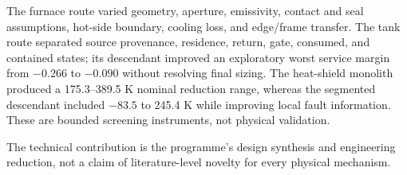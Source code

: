 The furnace route varied geometry, aperture, emissivity, contact and seal assumptions, hot-side boundary, cooling loss, and edge/frame transfer. The tank route separated source provenance, residence, return, gate, consumed, and contained states; its descendant improved an exploratory worst service margin from $-0.266$ to $-0.090$ without resolving final sizing. The heat-shield monolith produced a 175.3--389.5 K nominal reduction range, whereas the segmented descendant included $-83.5$ to 245.4 K while improving local fault information. These are bounded screening instruments, not physical validation.

The technical contribution is the programme's design synthesis and engineering reduction, not a claim of literature-level novelty for every physical mechanism.
